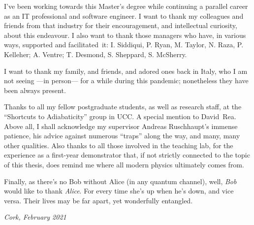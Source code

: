 \small{
I've been working towards this Master's degree
while continuing a parallel career
as an IT professional and software engineer.
I want to thank my
colleagues and friends from that industry for their encouragement,
and intellectual curiosity,
about this endeavour.
I also want to thank those managers
who have, in various ways, supported and facilitated~it:
I. Siddiqui, P. Ryan, M. Taylor, N. Raza, P. Kelleher;
A. Ventre;
T. Desmond, S. Sheppard, S. McSherry.

I want to thank my family, and friends, and adored ones back in Italy,
who I am not seeing ---in person--- for a while during this pandemic;
nonetheless they have been always present.

Thanks to all my fellow postgraduate students,
as well as research staff,
at the ``Shortcuts to Adiabaticity'' group in UCC.
A special mention to David~Rea.
Above all, I shall acknowledge my supervisor Andreas Ruschhaupt's immense patience,
his advice against numerous ``traps'' along the way, and many, many other qualities.
Also thanks to all those involved in the teaching lab, for the experience as a
first-year demonstrator that,
if not strictly connected to the topic of this thesis,
does remind me where all modern physics ultimately comes from.

Finally, as there's no Bob without Alice (in any quantum channel),
well,
\emph{Bob} would like to thank \emph{Alice}.
For every time she's up when he's down,
and vice versa.
Their lives may be far apart,
yet wonderfully entangled.

\emph{Cork, February 2021}
}
